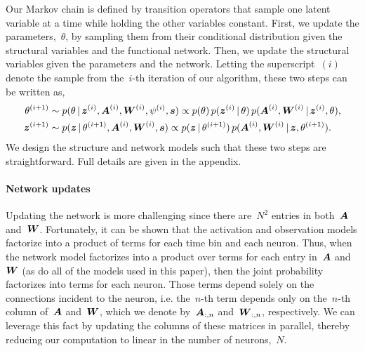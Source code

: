 Our Markov chain is defined by transition operators that sample one latent variable at a time while holding the other variables constant. First, we update the parameters,~$\theta$, by sampling them from their conditional distribution given the structural variables and the functional network. Then, we update the structural variables given the parameters and the network. Letting the superscript~$(i)$ denote the sample from the~$i$-th iteration of our algorithm, these two steps can be written as,
\begin{align}
\theta^{(i+1)} &\sim p(\theta \,|\, \boldsymbol{z}^{(i)}, \boldsymbol{A}^{(i)}, \boldsymbol{W}^{(i)}, \psi^{(i)}, \boldsymbol{s}) 
\propto p(\theta) \, p(\boldsymbol{z}^{(i)} \,|\, \theta) \, p(\boldsymbol{A}^{(i)}, \boldsymbol{W}^{(i)} \,|\, \boldsymbol{z}^{(i)}, \theta),\\
\boldsymbol{z}^{(i+1)} &\sim p(\boldsymbol{z} \,|\, \theta^{(i+1)}, \boldsymbol{A}^{(i)}, \boldsymbol{W}^{(i)}, \boldsymbol{s}) 
\propto p(\boldsymbol{z} \,|\, \theta^{(i+1)}) \, p(\boldsymbol{A}^{(i)}, \boldsymbol{W}^{(i)} \,|\, \boldsymbol{z}, \theta^{(i+1)}).
\end{align}
We design the structure and network models such that these two steps are straightforward. Full details are given in the appendix.

\paragraph{Network updates} Updating the network is more challenging since there are~$N^2$ entries in both~$\boldsymbol{A}$ and~$\boldsymbol{W}$. 
Fortunately, it can be shown that the activation and observation models factorize into a product of terms for each time bin and each neuron.
Thus, when the network model factorizes into a product over terms for each entry in~$\boldsymbol{A}$ and~$\boldsymbol{W}$ (as do all of the models used in this paper), then the joint probability factorizes into terms for each neuron. 
Those terms depend solely on the connections incident to the neuron, i.e. the~$n$-th term depends only on the~$n$-th column of~$\boldsymbol{A}$ and~$\boldsymbol{W}$, which we denote by~$\boldsymbol{A}_{:,n}$ and~$\boldsymbol{W}_{:,n}$, respectively.
We can leverage this fact by updating the columns of these matrices in parallel, thereby reducing our computation to linear in the number of neurons,~$N$.

